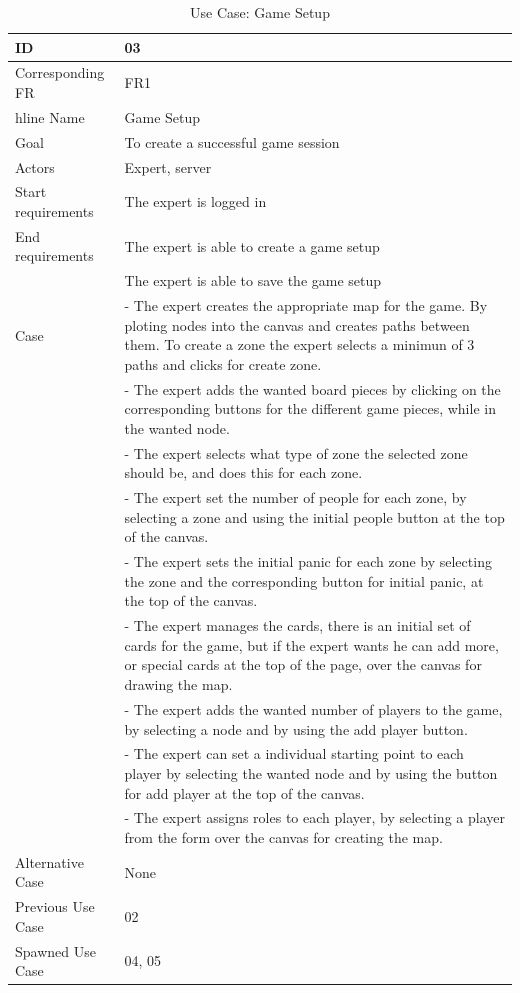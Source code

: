 \begin{table}[H]
\begin{tabular}{|l|p{14cm}|} \hline
	\textbf{ID} & \textbf{03}\\ \hline
	Corresponding FR & FR1\\hline
	Name & Game Setup\\ \hline
	Goal & To create a successful game session\\ \hline
	Actors & Expert, server\\ \hline
	Start requirements & The expert is logged in\\ \hline
	End requirements & The expert is able to create a game setup \\ 
						& The expert is able to save the game setup\\ \hline
	Case & - The expert creates the appropriate map for the game. By ploting nodes into the canvas
			and creates paths between them. To create a zone the expert selects a minimun of 3 paths and clicks for create zone.\\
			& - The expert adds the wanted board pieces by clicking on the corresponding buttons for the different game pieces, while in the wanted node. \\
			& - The expert selects what type of zone the selected zone should be, and does this for each zone.\\
			& - The expert set the number of people for each zone, by selecting a zone and using the initial people button at the top of the canvas.\\
			& - The expert sets the initial panic for each zone by selecting the zone and the corresponding button for initial panic, at the top of the canvas.\\
			& - The expert manages the cards, there is an initial set of cards for the game, but if the expert wants he can add more, or special cards at the top of the page, over the canvas for drawing the map.\\
			& - The expert adds the wanted number of players to the game, by selecting a node and by using the add player button.\\
			& - The expert can set a individual starting point to each player by selecting the wanted node and by using the button for add player at the top of the canvas.\\
			& - The expert assigns roles to each player, by selecting a player from the form over the canvas for creating the map. \\
			 \hline
	Alternative Case & None \\ \hline
	Previous Use Case & 02\\ \hline
	Spawned Use Case & 04, 05\\ \hline
\end{tabular}
\caption{Use Case: Game Setup}
\label{fig:usecase03table}
\end{table}


